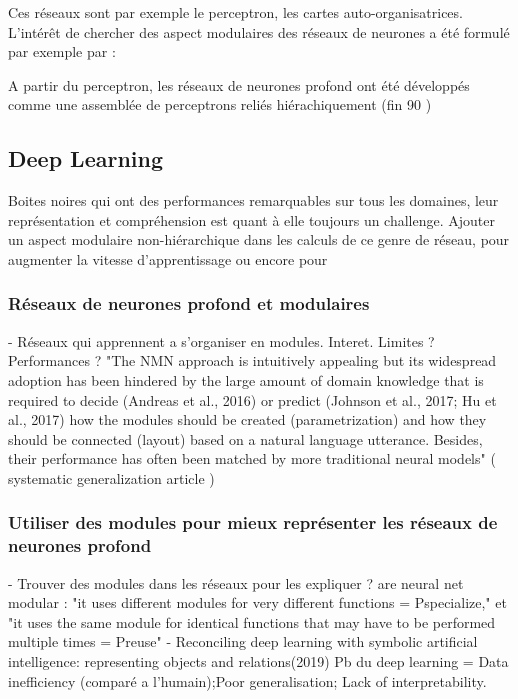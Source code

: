 Ces réseaux sont par exemple le perceptron, les cartes auto-organisatrices. 
L'intérêt de chercher des aspect modulaires des réseaux de neurones a été formulé par exemple par \cite{towards_novel_2001} : 

A partir du perceptron, les réseaux de neurones profond ont été développés comme une assemblée de perceptrons reliés hiérachiquement (fin 90 ) 

\subsection{Deep Learning}
Boites noires qui ont des performances remarquables sur tous les domaines, leur représentation et compréhension est quant à elle toujours un challenge. Ajouter un aspect modulaire non-hiérarchique dans les calculs de ce genre de réseau, pour augmenter la vitesse d'apprentissage ou encore pour 

\subsubsection{Réseaux de neurones profond et modulaires}

- Réseaux qui apprennent a s'organiser en modules. Interet. Limites ? Performances ? \cite{Andreas2016NeuralMN,Kirsch2018ModularNL}
"The NMN approach is intuitively appealing but its
widespread adoption has been hindered by the large amount of domain knowledge that is required
to decide (Andreas et al., 2016) or predict (Johnson et al., 2017; Hu et al., 2017) how the modules
should be created (parametrization) and how they should be connected (layout) based on a natural
language utterance. Besides, their performance has often been matched by more traditional neural
models" ( systematic generalization article ) 

\subsubsection{Utiliser des modules pour mieux représenter les réseaux de neurones profond}


- Trouver des modules dans les réseaux pour les expliquer ? \cite{Watanabe2018ModularRO,Csordas2021AreNN}
are neural net modular : "it uses different modules for very different functions = Pspecialize," et "it uses the same module for identical functions that
may have to be performed multiple times = Preuse"
- Reconciling deep learning with symbolic artificial intelligence: representing objects and relations(2019)
Pb du deep learning = Data inefficiency (comparé a l'humain);Poor generalisation; Lack of interpretability.

